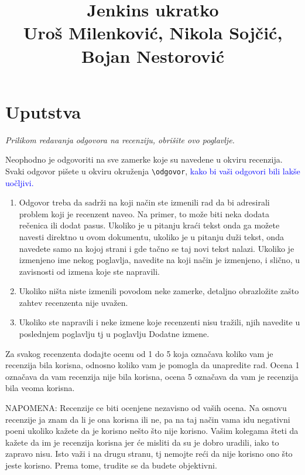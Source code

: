 \documentclass[a4paper]{report}
\newcommand{\odgovor}[1]{\textcolor{blue}{#1}}
\begin{document}
\title{Jenkins ukratko\\
  \small{Uroš Milenković, Nikola Sojčić, Bojan Nestorović
}}

\maketitle
\tableofcontents

\chapter{Uputstva}
\emph{Prilikom redavanja odgovora na recenziju, obrišite ovo poglavlje.}

Neophodno je odgovoriti na sve zamerke koje su navedene u okviru recenzija. Svaki odgovor pišete u okviru okruženja \verb"\odgovor", \odgovor{kako bi vaši odgovori bili lakše uočljivi.} 
\begin{enumerate}

\item Odgovor treba da sadrži na koji način ste izmenili rad da bi adresirali problem koji je recenzent naveo. Na primer, to može biti neka dodata rečenica ili dodat pasus. Ukoliko je u pitanju kraći tekst onda ga možete navesti direktno u ovom dokumentu, ukoliko je u pitanju duži tekst, onda navedete samo na kojoj strani i gde tačno se taj novi tekst nalazi. Ukoliko je izmenjeno ime nekog poglavlja, navedite na koji način je izmenjeno, i slično, u zavisnosti od izmena koje ste napravili. 

\item Ukoliko ništa niste izmenili povodom neke zamerke, detaljno obrazložite zašto zahtev recenzenta nije uvažen.

\item Ukoliko ste napravili i neke izmene koje recenzenti nisu tražili, njih navedite u poslednjem poglavlju tj u poglavlju Dodatne izmene.
\end{enumerate}

Za svakog recenzenta dodajte ocenu od 1 do 5 koja označava koliko vam je recenzija bila korisna, odnosno koliko vam je pomogla da unapredite rad. Ocena 1 označava da vam recenzija nije bila korisna, ocena 5 označava da vam je recenzija bila veoma korisna. 

NAPOMENA: Recenzije ce biti ocenjene nezavisno od vaših ocena. Na osnovu recenzije ja znam da li je ona korisna ili ne, pa na taj način vama idu negativni poeni ukoliko kažete da je korisno nešto što nije korisno. Vašim kolegama šteti da kažete da im je recenzija korisna jer će misliti da su je dobro uradili, iako to zapravo nisu. Isto važi i na drugu stranu, tj nemojte reći da nije korisno ono što jeste korisno. Prema tome, trudite se da budete objektivni. 
\end{document}
